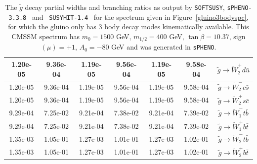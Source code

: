 \documentclass[final,3p,times]{elsarticle}
\begin{document}
\begin{center}
\begin{table}
\begin{tabular}{|c|c|c|c|c|c|c|}
1.20e-05 & 9.36e-04 & 1.19e-05 & 9.56e-04 & 1.19e-05 & 9.58e-04 & $\tilde{g} \rightarrow \tilde{W}_2^+ d \bar{u}$ \\ \hline
1.20e-05 & 9.36e-04 & 1.19e-05 & 9.56e-04 & 1.19e-05 & 9.58e-04 & $\tilde{g} \rightarrow \tilde{W}_2^- c \bar{s}$ \\ \hline
1.20e-05 & 9.36e-04 & 1.19e-05 & 9.56e-04 & 1.19e-05 & 9.58e-04 & $\tilde{g} \rightarrow \tilde{W}_2^+ s \bar{c}$ \\ \hline
9.29e-04 & 7.25e-02 & 9.21e-04 & 7.38e-02 & 9.21e-04 & 7.39e-02 & $\tilde{g} \rightarrow \tilde{W}_1^- t \bar{b}$ \\ \hline
9.29e-04 & 7.25e-02 & 9.21e-04 & 7.38e-02 & 9.21e-04 & 7.39e-02 & $\tilde{g} \rightarrow \tilde{W}_1^+ b \bar{t}$ \\ \hline
1.35e-03 & 1.05e-01 & 1.27e-03 & 1.01e-01 & 1.27e-03 & 1.02e-01 & $\tilde{g} \rightarrow \tilde{W}_2^- t \bar{b}$ \\ \hline
1.35e-03 & 1.05e-01 & 1.27e-03 & 1.01e-01 & 1.27e-03 & 1.02e-01 & $\tilde{g} \rightarrow \tilde{W}_2^+ b \bar{t}$ \\ \hline
\end{tabular}
\caption{The $\tilde{g}$ decay partial widths and branching ratios as output
  by {\tt SOFTSUSY}, {\tt sPHENO-3.3.8}~\cite{Porod:2003um} and {\tt
    SUSYHIT-1.4}~\cite{Djouadi:2006bz} for the spectrum given in
  Figure~\ref{gluino3bodyspc}, for which the gluino only has 3 body decay
  modes kinematically available. 
This CMSSM spectrum has $m_0 = 1500$
  GeV, $m_{1/2} 
  = 400$ GeV, $\tan\beta = 10.37$, sign$(\mu) = +1$, $A_0 = -80$ GeV and was
  generated 
  in {\tt sPHENO}.
} 
\label{gluino3bodycomp}
\end{table}
\end{center}
\end{document}

